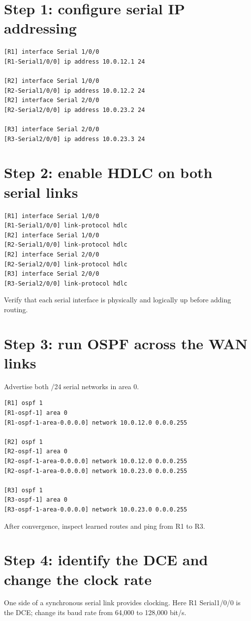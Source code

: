 \section{Step 1: configure serial IP addressing}
\begin{lstlisting}[style=utpterminal]
[R1] interface Serial 1/0/0
[R1-Serial1/0/0] ip address 10.0.12.1 24

[R2] interface Serial 1/0/0
[R2-Serial1/0/0] ip address 10.0.12.2 24
[R2] interface Serial 2/0/0
[R2-Serial2/0/0] ip address 10.0.23.2 24

[R3] interface Serial 2/0/0
[R3-Serial2/0/0] ip address 10.0.23.3 24
\end{lstlisting}

\section{Step 2: enable HDLC on both serial links}
\begin{lstlisting}[style=utpterminal]
[R1] interface Serial 1/0/0
[R1-Serial1/0/0] link-protocol hdlc
[R2] interface Serial 1/0/0
[R2-Serial1/0/0] link-protocol hdlc
[R2] interface Serial 2/0/0
[R2-Serial2/0/0] link-protocol hdlc
[R3] interface Serial 2/0/0
[R3-Serial2/0/0] link-protocol hdlc
\end{lstlisting}
Verify that each serial interface is physically and logically up before adding routing.

\section{Step 3: run OSPF across the WAN links}
Advertise both /24 serial networks in area 0.
\begin{lstlisting}[style=utpterminal]
[R1] ospf 1
[R1-ospf-1] area 0
[R1-ospf-1-area-0.0.0.0] network 10.0.12.0 0.0.0.255

[R2] ospf 1
[R2-ospf-1] area 0
[R2-ospf-1-area-0.0.0.0] network 10.0.12.0 0.0.0.255
[R2-ospf-1-area-0.0.0.0] network 10.0.23.0 0.0.0.255

[R3] ospf 1
[R3-ospf-1] area 0
[R3-ospf-1-area-0.0.0.0] network 10.0.23.0 0.0.0.255
\end{lstlisting}
After convergence, inspect learned routes and ping from R1 to R3.

\section{Step 4: identify the DCE and change the clock rate}
One side of a synchronous serial link provides clocking. Here R1 Serial1/0/0 is the DCE; change its baud rate from 64,000 to 128,000 bit/s.

